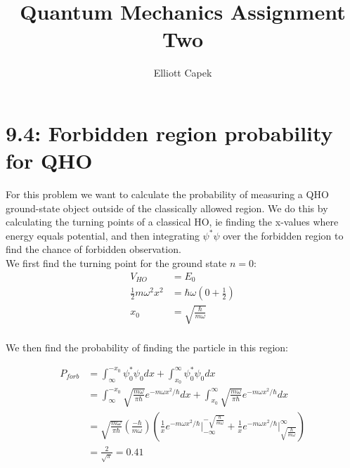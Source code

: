 \documentclass[10pt]{article} %
\title{Quantum Mechanics Assignment Two}
\author{Elliott Capek}
\begin{document}
\maketitle{}

\section{9.4: Forbidden region probability for QHO}
For this problem we want to calculate the probability of measuring a QHO ground-state object outside
of the classically allowed region. We do this by calculating the turning points of a classical HO,
ie finding the x-values where energy equals potential, and then integrating $\psi^*\psi$ over the
forbidden region to find the chance of forbidden observation.\\

We first find the turning point for the ground state $n=0$:
\begin{align*}
  V_{HO} &= E_0\\
  \frac{1}{2}m\omega^2x^2 &= \hbar\omega\left(0+\frac{1}{2}\right)\\
  x_0 &= \sqrt{\frac{\hbar}{m\omega}}\\
\end{align*}

We then find the probability of finding the particle in this region:

\begin{align*}
  P_{forb} &= \int_{\infty}^{-x_0} \psi_0^*\psi_0 dx + \int_{x_0}^{\infty} \psi_0^*\psi_0 dx\\
  &= \int_{\infty}^{-x_0} \sqrt{\frac{m\omega}{\pi\hbar}}e^{-m\omega x^2 / \hbar}dx
  + \int_{x_0}^{\infty} \sqrt{\frac{m\omega}{\pi\hbar}}e^{-m\omega x^2 / \hbar} dx\\
  &= \sqrt{\frac{m\omega}{\pi\hbar}} \left(\frac{-\hbar}{m\omega}\right)\left(
    \frac{1}{x}e^{-m\omega x^2 / \hbar} \Bigg|_{-\infty}^{-\sqrt{\frac{\hbar}{m\omega}}} +
    \frac{1}{x}e^{-m\omega x^2 / \hbar} \Bigg|_{\sqrt{\frac{\hbar}{m\omega}}}^{\infty}\right)\\
  &= \frac{2}{\sqrt{\pi}} = 0.41\\
\end{align*}

\end{document}
